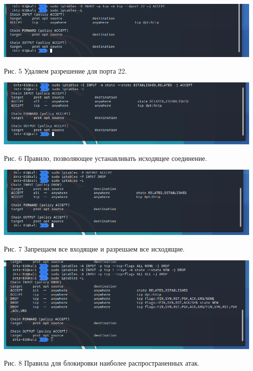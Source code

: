 \documentclass[a4paper,14pt]{extarticle}
\begin{document}
\begin{center}
        \includegraphics[scale=0.5]{pics/5.png}

        Рис. 5 Удаляем разрешение для порта 22.

        \includegraphics[scale=0.5]{pics/6.png}

        Рис. 6 Правило, позволяющее устанавливать исходящее соединение.  

        \includegraphics[scale=0.5]{pics/7.png}
        
        Рис. 7 Запрещаем все входящие и разрешаем все исходящие.

        \includegraphics[scale=0.5]{pics/8.png}

        Рис. 8  Правила для блокировки наиболее распространенных атак.
    \end{center}
\end{document}
